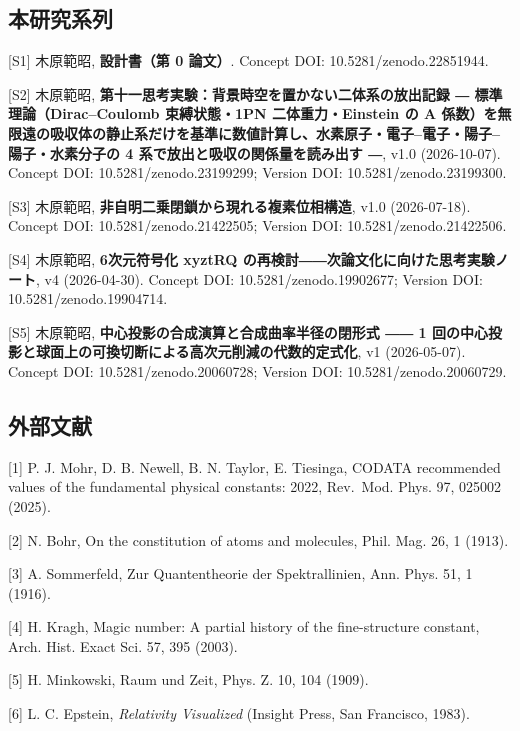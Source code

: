 \documentclass[
  a4paper,
]{ltjsarticle}
\begin{document}
\subsection{本研究系列}\label{ux672cux7814ux7a76ux7cfbux5217}

{[}S1{]} 木原範昭, \textbf{設計書（第 0 論文）}. Concept DOI:
10.5281/zenodo.22851944.

{[}S2{]} 木原範昭,
\textbf{第十一思考実験：背景時空を置かない二体系の放出記録 ―
標準理論（Dirac--Coulomb 束縛状態・1PN 二体重力・Einstein の A
係数）を無限遠の吸収体の静止系だけを基準に数値計算し、水素原子・電子--電子・陽子--陽子・水素分子の
4 系で放出と吸収の関係量を読み出す ―}, v1.0 (2026-10-07). Concept DOI:
10.5281/zenodo.23199299; Version DOI: 10.5281/zenodo.23199300.

{[}S3{]} 木原範昭, \textbf{非自明二乗閉鎖から現れる複素位相構造}, v1.0
(2026-07-18). Concept DOI: 10.5281/zenodo.21422505; Version DOI:
10.5281/zenodo.21422506.

{[}S4{]} 木原範昭, \textbf{6次元符号化 xyztRQ
の再検討――次論文化に向けた思考実験ノート}, v4 (2026-04-30). Concept DOI:
10.5281/zenodo.19902677; Version DOI: 10.5281/zenodo.19904714.

{[}S5{]} 木原範昭, \textbf{中心投影の合成演算と合成曲率半径の閉形式 ―― 1
回の中心投影と球面上の可換切断による高次元削減の代数的定式化}, v1
(2026-05-07). Concept DOI: 10.5281/zenodo.20060728; Version DOI:
10.5281/zenodo.20060729.

\subsection{外部文献}\label{ux5916ux90e8ux6587ux732e}

{[}1{]} P. J. Mohr, D. B. Newell, B. N. Taylor, E. Tiesinga, CODATA
recommended values of the fundamental physical constants: 2022,
Rev.~Mod. Phys. 97, 025002 (2025).

{[}2{]} N. Bohr, On the constitution of atoms and molecules, Phil. Mag.
26, 1 (1913).

{[}3{]} A. Sommerfeld, Zur Quantentheorie der Spektrallinien, Ann. Phys.
51, 1 (1916).

{[}4{]} H. Kragh, Magic number: A partial history of the fine-structure
constant, Arch. Hist. Exact Sci. 57, 395 (2003).

{[}5{]} H. Minkowski, Raum und Zeit, Phys. Z. 10, 104 (1909).

{[}6{]} L. C. Epstein, \emph{Relativity Visualized} (Insight Press, San
Francisco, 1983).
\end{document}
